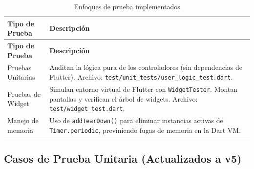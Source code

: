 \documentclass[12pt,a4paper]{article}
\begin{document}
\begin{longtable}{p{4cm} p{9.5cm}}
\caption{Enfoques de prueba implementados} \label{tab:estrategia-test} \\
\toprule
\textbf{Tipo de Prueba} & \textbf{Descripción} \\
\midrule
\endfirsthead
\toprule
\textbf{Tipo de Prueba} & \textbf{Descripción} \\
\midrule
\endhead
\bottomrule
\endlastfoot
Pruebas Unitarias & Auditan la lógica pura de los controladores (sin dependencias de Flutter). Archivo: \texttt{test/unit\_tests/user\_logic\_test.dart}. \\[0.3em]
Pruebas de Widget & Simulan entorno virtual de Flutter con \texttt{WidgetTester}. Montan pantallas y verifican el árbol de widgets. Archivo: \texttt{test/widget\_test.dart}. \\[0.3em]
Manejo de memoria & Uso de \texttt{addTearDown()} para eliminar instancias activas de \texttt{Timer.periodic}, previniendo fugas de memoria en la Dart VM. \\
\end{longtable}

\subsection{Casos de Prueba Unitaria (Actualizados a v5)}
\end{document}
